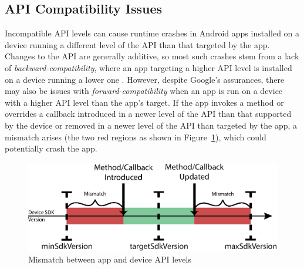     
\subsection{API Compatibility Issues}
\label{API Compatibility Issues}

Incompatible API levels can cause runtime crashes in
Android apps installed on a device running a different
level of the API than that targeted by the app. Changes
to the API are generally additive, so most such crashes
stem from a lack of {\it backward-compatibility}, where
an app targeting a higher API level is installed on a
device running a lower one \cite{sdkversions}. However,
despite Google's assurances, there may also be issues
with {\it forward-compatibility} when an app is run on
a device with a higher API level than the app's target.
If the app invokes a method or overrides a callback
introduced in a newer level of the API than that
supported by the device or removed in a newer level of
the API than targeted by the app, a mismatch arises
(the two red regions as shown in
Figure~\ref{fig:api-mismatch}), which could potentially
crash the app.

\begin{figure}%
    \centering
    \includegraphics[width=0.85\columnwidth]{images/api-mismatch} 
    \vspace{-0.1cm}
    \caption{Mismatch between app and device API levels} 
    \label{fig:api-mismatch} 
    \vspace{-0.5cm}
\end{figure}

